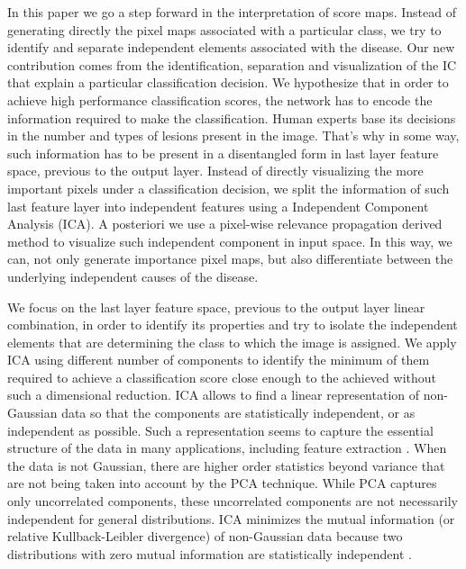 \documentclass[review]{elsarticle}
\theoremstyle{definition} %
\theoremstyle{remark}
\begin{document}
In this paper we go a step forward in the interpretation of score maps. Instead of generating directly the pixel maps associated with a particular class, we try to identify and separate independent elements associated with the disease. Our new contribution comes from the identification, separation and visualization of the IC that explain a particular classification decision. We hypothesize that in order to achieve high performance classification scores, the network has to encode the information required to make the classification. Human experts base its decisions in the number and types of lesions present in the image. That's why in some way, such information has to be present in a disentangled form in last layer feature space, previous to the output layer.  Instead of directly visualizing the more important pixels under a classification decision, we split the information of such last feature layer into independent features using a Independent Component Analysis (ICA). A posteriori we use a pixel-wise relevance propagation derived method to visualize such independent component in input space. In this way, we can, not only generate importance pixel maps, but also differentiate between the underlying independent causes of the disease.

We focus on the last layer feature space, previous to the output layer linear combination, in order to identify its properties and try to isolate the independent elements that are determining the class to which the image is assigned. 
We apply ICA \cite{hyvarinen2000independent} using different number of components to identify the minimum of them required to achieve a classification score close enough to the achieved without such a dimensional reduction.  ICA allows to find a linear representation of non-Gaussian data so that the components are statistically independent, or as independent as possible. Such a representation seems to capture the essential structure of the data in many applications, including feature extraction \cite{hyvarinen2000independent}. When the data is not Gaussian, there are higher order statistics beyond variance that are not being taken into account by the PCA technique. While PCA captures only uncorrelated components, these uncorrelated components are not necessarily independent for general distributions. ICA minimizes the mutual information (or relative Kullback-Leibler divergence) of non-Gaussian data because two distributions with zero mutual information are statistically independent \cite{comon1992independent}. 
\end{document}
